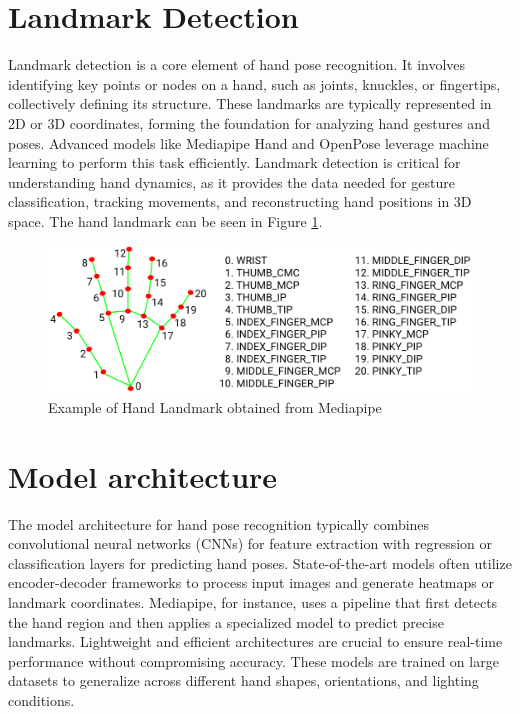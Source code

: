 \section{Landmark Detection}
Landmark detection is a core element of hand pose recognition. It involves identifying key points or nodes on a hand, such as joints, knuckles, or fingertips, collectively defining its structure. These landmarks are typically represented in 2D or 3D coordinates, forming the foundation for analyzing hand gestures and poses. Advanced models like Mediapipe Hand and OpenPose leverage machine learning to perform this task efficiently. Landmark detection is critical for understanding hand dynamics, as it provides the data needed for gesture classification, tracking movements, and reconstructing hand positions in 3D space. The hand landmark can be seen in Figure \ref{fig:hand_landmark}.

\begin{figure}[h!]
	\centering
	\includegraphics[width=\linewidth]{img/hand_landmarks} %
	\caption{Example of Hand Landmark obtained from Mediapipe}
	\label{fig:hand_landmark} %
\end{figure}

\section{Model architecture}
The model architecture for hand pose recognition typically combines convolutional neural networks (CNNs) for feature extraction with regression or classification layers for predicting hand poses. State-of-the-art models often utilize encoder-decoder frameworks to process input images and generate heatmaps or landmark coordinates. Mediapipe, for instance, uses a pipeline that first detects the hand region and then applies a specialized model to predict precise landmarks. Lightweight and efficient architectures are crucial to ensure real-time performance without compromising accuracy. These models are trained on large datasets to generalize across different hand shapes, orientations, and lighting conditions.

